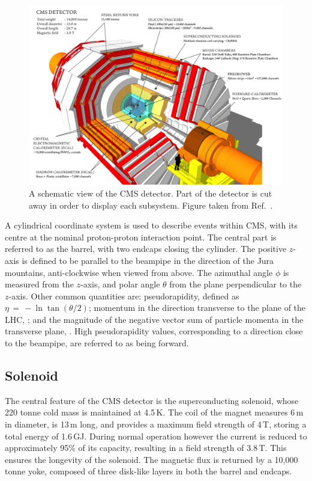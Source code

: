 \begin{figure}[h!]
  \centering
  \includegraphics[width=\textwidth]{Figures/Detector/CMSschematic.png}
  \caption[A schematic view of the CMS detector.]
  {
    A schematic view of the CMS detector.
    Part of the detector is cut away in order to display each subsystem.
    Figure taken from Ref.~\cite{SketchUp}.
  }
  \label{fig:detector_CMSschematic}
\end{figure}

A cylindrical coordinate system is used to describe events within CMS, with its centre at the nominal proton-proton interaction point.
The central part is referred to as the barrel, with two endcaps closing the cylinder.
The positive $z$-axis is defined to be parallel to the beampipe in the direction of the Jura mountains, anti-clockwise when viewed from above.
The azimuthal angle $\phi$ is measured from the $z$-axis, and polar angle $\theta$ from the plane perpendicular to the $z$-axis.
Other common quantities are: pseudorapidity, defined as $\eta \, = \, -\ln{\tan{(\theta/2)}}$; 
momentum in the direction transverse to the plane of the LHC, \pt; 
and the magnitude of the negative vector sum of particle momenta in the transverse plane, \met.
High pseudorapidity values, corresponding to a direction close to the beampipe, are referred to as being forward.

\subsection{Solenoid}

The central feature of the CMS detector is the superconducting solenoid, whose 220 tonne cold mass is maintained at 4.5\,K.%
The coil of the magnet measures 6\,m in diameter, is 13\,m long, and provides a maximum field strength of 4\,T, storing a total energy of 1.6\,GJ.
During normal operation however the current is reduced to approximately 95\% of its capacity, resulting in a field strength of 3.8\,T.
This ensures the longevity of the solenoid.
The magnetic flux is returned by a 10,000 tonne yoke, composed of three disk-like layers in both the barrel and endcaps.

